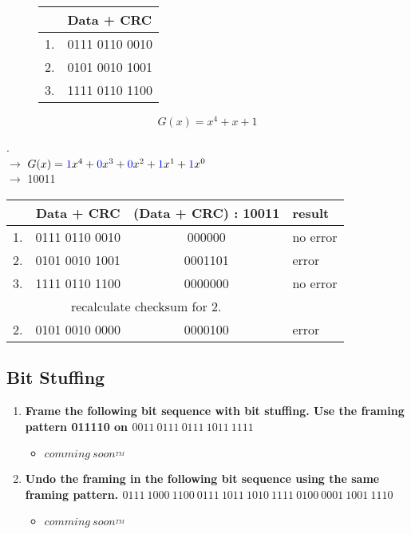 \documentclass[a4paper,12pt]{article}
\begin{document}
	\begin{figure}[h!]
		\begin{minipage}{0.49\linewidth}
			\centering
			\begin{tabular}{c|l}\hline
				~ & Data + CRC \\ \hline
				1. & 0111 0110 0010 \\
				2. & 0101 0010 1001 \\
				3. & 1111 0110 1100 \\ \hline
			\end{tabular}
		\end{minipage}
		\hfill
		\begin{minipage}{0.49\linewidth}
			\begin{equation*}
			G(x) = x^4 + x + 1		
			\end{equation*}
		\end{minipage}	
	\end{figure}.
\\
	$\rightarrow$	$G(x) = \textcolor{blue}{1}x^4 + \textcolor{blue}{0}x^3 + \textcolor{blue}{0}x^2 + \textcolor{blue}{1}x^1 + \textcolor{blue}{1}x^0$ \\
	$\rightarrow$ 10011 
	
	\begin{table}[h!]
		\begin{tabular}{c|c|c|l}\hline
			~ & Data + CRC & (Data + CRC) : 10011 & result \\ \hline
			1. & 0111 0110 0010 & 000000 & no error \\
			2. & 0101 0010 1001 & 0001101 & error \\
			3. & 1111 0110 1100 & 0000000 & no error\\ \hline
			\multicolumn{3}{1}{recalculate checksum for 2.} \\ \hline
			2. & 0101 0010 0000 & 0000100 & error \\
		\end{tabular}
	\end{table}
	
	
	\subsection{Bit Stuffing}
	\begin{enumerate}[label=(\roman*),itemsep=0pt]
		\item \textbf{Frame the following bit sequence with bit stuffing. Use the framing pattern 011110 on $0011~0111~0111~1011~1111$}
		\begin{itemize}
			\item \textit{$comming~ soon^{_{TM}}$}
		\end{itemize}
		\item \textbf{Undo the framing in the following bit sequence using the same framing pattern. $0111~1000~ 1100~ 0111~ 1011~ 1010~ 1111~ 0100~ 0001~ 1001~ 1110$}
		\begin{itemize}
			\item \textit{$comming~ soon^{_{TM}}$}
		\end{itemize}
	\end{enumerate}
\end{document}
